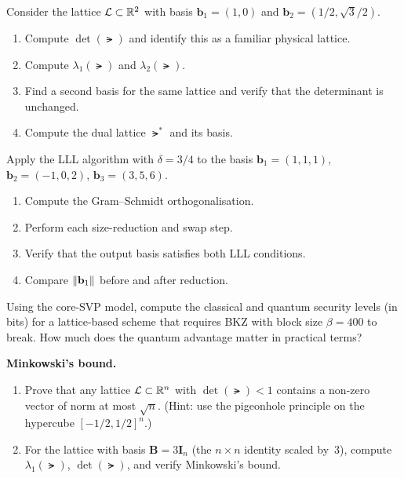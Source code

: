 \begin{prob}
\label{prob:ch06-hexagonal}
Consider the lattice $\mathcal{L}\subset\mathbb{R}^2$ with basis $\mathbf{b}_1 = (1, 0)$ and $\mathbf{b}_2 = (1/2, \sqrt{3}/2)$.
\begin{enumerate}
\item[(a)] Compute $\det(\lat)$ and identify this as a familiar physical lattice.
\item[(b)] Compute $\lambda_1(\lat)$ and $\lambda_2(\lat)$.
\item[(c)] Find a second basis for the same lattice and verify that the determinant is unchanged.
\item[(d)] Compute the dual lattice $\lat^*$ and its basis.
\end{enumerate}
\end{prob}

\begin{prob}
\label{prob:ch06-lll}
Apply the LLL algorithm with $\delta = 3/4$ to the basis $\mathbf{b}_1 = (1, 1, 1)$, $\mathbf{b}_2 = (-1, 0, 2)$, $\mathbf{b}_3 = (3, 5, 6)$.
\begin{enumerate}
\item[(a)] Compute the Gram--Schmidt orthogonalisation.
\item[(b)] Perform each size-reduction and swap step.
\item[(c)] Verify that the output basis satisfies both LLL conditions.
\item[(d)] Compare $\left\lVert \mathbf{b}_1 \right\rVert$ before and after reduction.
\end{enumerate}
\end{prob}

\begin{prob}
\label{prob:ch06-hardness}
Using the core-SVP model, compute the classical and quantum security levels (in bits) for a lattice-based scheme that requires BKZ with block size $\beta = 400$ to break.  How much does the quantum advantage matter in practical terms?
\end{prob}

\begin{prob}
\label{prob:ch06-minkowski}
\textbf{Minkowski's bound.}
\begin{enumerate}
\item[(a)] Prove that any lattice $\mathcal{L}\subset\mathbb{R}^n$ with $\det(\lat) < 1$ contains a non-zero vector of norm at most $\sqrt{n}$.  (Hint: use the pigeonhole principle on the hypercube $[-1/2,1/2]^n$.)
\item[(b)] For the lattice with basis $\mathbf{B} = 3\mathbf{I}_n$ (the $n\times n$ identity scaled by~$3$), compute $\lambda_1(\lat)$, $\det(\lat)$, and verify Minkowski's bound.
\end{enumerate}
\end{prob}

